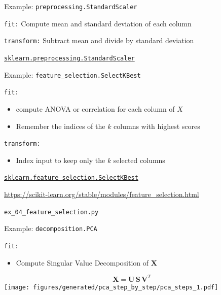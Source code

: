 \documentclass[presentation,mathserif,table]{beamer}
\newcommand{\X}{{\mathbold X}}
\newcommand{\bS}{{\mathbold S}}
\newcommand{\U}{{\mathbold U}}
\newcommand{\V}{{\mathbold V}}
\begin{document}
\begin{frame}[label={sec:org02905ad},fragile]{Example: \texttt{preprocessing.StandardScaler}}
 \begin{block}{\texttt{fit:}}
Compute mean and standard deviation of each column
\end{block}
\begin{block}{\texttt{transform:}}
Subtract mean and divide by standard deviation
\end{block}
\begin{structureenv} %
\href{https://scikit-learn.org/stable/modules/generated/sklearn.preprocessing.StandardScaler.html\#sklearn.preprocessing.StandardScaler}{\texttt{sklearn.preprocessing.StandardScaler}}
\end{structureenv}
\end{frame}
\begin{frame}[label={sec:orgfcad261},fragile]{Example: \texttt{feature\_selection.SelectKBest}}
 \begin{block}{\texttt{fit:}}
\begin{itemize}
\item compute ANOVA or correlation for each column of \(X\)
\item Remember the indices of the \(k\) columns with highest scores
\end{itemize}
\end{block}
\begin{block}{\texttt{transform:}}
\begin{itemize}
\item Index input to keep only the \(k\) selected columns
\end{itemize}
\end{block}


\begin{structureenv} %
\href{https://scikit-learn.org/stable/modules/generated/sklearn.feature\_selection.SelectKBest.html\#sklearn.feature\_selection.SelectKBest}{\texttt{sklearn.feature\_selection.SelectKBest}}

\url{https://scikit-learn.org/stable/modules/feature\_selection.html}

\texttt{ex\_04\_feature\_selection.py}
\end{structureenv}
\end{frame}
\begin{frame}[label={sec:org1ed3f0a},fragile]{Example: \texttt{decomposition.PCA}}
 \begin{block}{\texttt{fit:}}
\begin{itemize}
\item Compute Singular Value Decomposition of \(\X\)
\end{itemize}
\begin{structureenv} %
\begin{equation}
\X = \U \, \bS \, \V^T
\end{equation}
\texttt{[image: figures/generated/pca\_step\_by\_step/pca\_steps\_1.pdf]}
\end{structureenv}
\end{block}
\end{frame}
\end{document}
